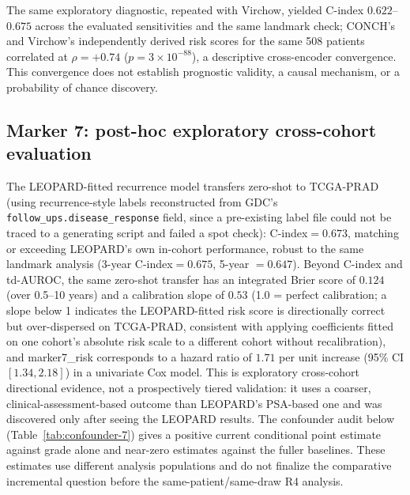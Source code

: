 The same exploratory diagnostic, repeated with Virchow, yielded C-index $0.622$--$0.675$
across the evaluated sensitivities and the same landmark check; CONCH's and Virchow's
independently derived risk scores for the same 508 patients correlated at $\rho=+0.74$
($p=3\times10^{-88}$), a descriptive cross-encoder convergence. This convergence does not
establish prognostic validity, a causal mechanism, or a probability of chance discovery.

\subsection{Marker 7: post-hoc exploratory cross-cohort evaluation}
\label{sec:res-marker7}

The LEOPARD-fitted recurrence model transfers zero-shot to TCGA-PRAD (using recurrence-style
labels reconstructed from GDC's \texttt{follow\_ups.disease\_response} field, since a
pre-existing label file could not be traced to a generating script and failed a spot check):
C-index$=0.673$, matching or exceeding LEOPARD's own in-cohort performance, robust to the same
landmark analysis (3-year C-index$=0.675$, 5-year $=0.647$). Beyond C-index and td-AUROC, the
same zero-shot transfer has an integrated Brier score of $0.124$ (over 0.5--10 years) and a
calibration slope of $0.53$ (1.0 = perfect calibration; a slope below 1 indicates the
LEOPARD-fitted risk score is directionally correct but over-dispersed on TCGA-PRAD, consistent
with applying coefficients fitted on one cohort's absolute risk scale to a different cohort
without recalibration), and marker7\_risk corresponds to a hazard ratio of $1.71$ per unit
increase (95\% CI $[1.34, 2.18]$) in a univariate Cox model. This is exploratory cross-cohort
directional evidence, not a prospectively tiered validation: it uses a coarser,
clinical-assessment-based outcome than LEOPARD's PSA-based one and was discovered only after
seeing the LEOPARD results. The confounder audit below (Table~\ref{tab:confounder-7}) gives a
positive current conditional point estimate against grade alone and near-zero estimates against
the fuller baselines. These estimates use different analysis populations and do not finalize
the comparative incremental question before the same-patient/same-draw R4 analysis.

